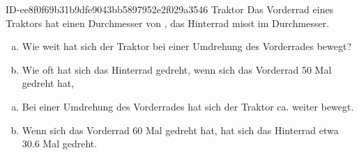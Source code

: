 \begin{exercise}
      {ID-ee8f0f69b31b9dfe9043bb5897952e2f029a3546}
      {Traktor}
  \ifproblem\problem
    Das Vorderrad eines Traktors hat einen Durchmesser von , das
    Hinterrad misst  im Durchmesser.
    \begin{enumerate}[a)]
      \item Wie weit hat sich der Traktor bei einer Umdrehung
            des Vorderrades bewegt?
      \item Wie oft hat sich das Hinterrad gedreht, wenn sich
            das Vorderrad \num{50} Mal gedreht hat,
    \end{enumerate}
  \fi
  \ifoutcome\outcome
    \begin{enumerate}[a)]
      \item Bei einer Umdrehung des Vorderrades hat sich der Traktor
            ca.  weiter bewegt.
      \item Wenn sich das Vorderrad \num{60} Mal gedreht hat, hat
            sich das Hinterrad etwa \num{30.6} Mal gedreht.
    \end{enumerate}
  \fi
\end{exercise}
